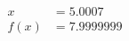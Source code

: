 \documentclass[preview]{standalone}
\begin{document}
\begin{align*}
x &= 5.0007\\f(x) &= 7.9999999
\end{align*}
\end{document}
